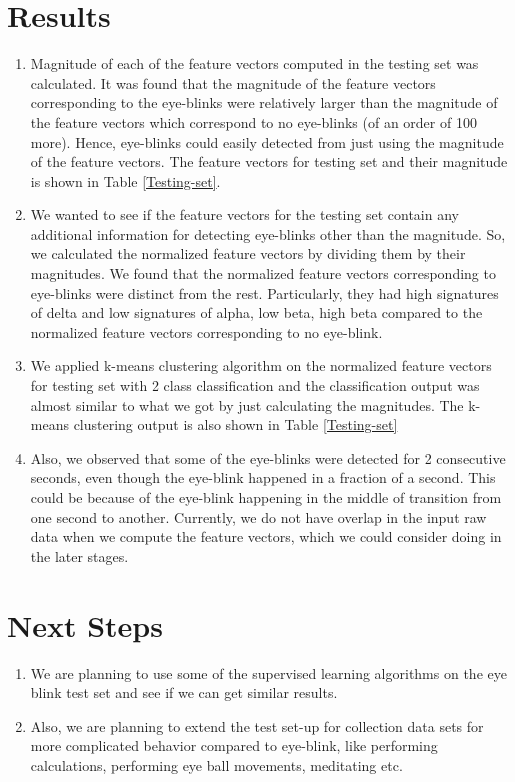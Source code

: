 \documentclass[11pt]{amsart}
\begin{document}
\section{Results}
\begin{enumerate}
\item Magnitude of each of the feature vectors computed in the testing set was calculated. It was found that the magnitude of the feature vectors corresponding to the eye-blinks were relatively larger than the magnitude of the feature vectors which correspond to no eye-blinks (of an order of 100 more). Hence, eye-blinks could easily detected from just using the magnitude of the feature vectors. The feature vectors for testing set and their magnitude is shown in Table \ref{Testing-set}.

\item We wanted to see if the feature vectors for the testing set contain any additional information for detecting eye-blinks other than the magnitude. So, we calculated the normalized feature vectors by dividing them by their magnitudes. We found that the normalized feature vectors corresponding to eye-blinks were distinct from the rest. Particularly, they had high signatures of delta and low signatures of alpha, low beta, high beta compared to the normalized feature vectors corresponding to no eye-blink.

\item We applied k-means clustering algorithm on the normalized feature vectors for testing set with 2 class classification and the classification output was almost similar to what we got by just calculating the magnitudes. The k-means clustering output is also shown in Table \ref{Testing-set}

\item Also, we observed that some of the eye-blinks were detected for 2 consecutive seconds, even though the eye-blink happened in a fraction of a second. This could be because of the eye-blink happening in the middle of transition from one second to another. Currently, we do not have overlap in the input raw data when we compute the feature vectors, which we could consider doing in the later stages.
\end{enumerate}

\section{Next Steps}
\begin{enumerate}
\item We are planning to use some of the supervised learning algorithms on the eye blink test set and see if we can get similar results.
\item Also, we are planning to extend the test set-up for collection data sets for more complicated behavior compared to eye-blink, like performing calculations, performing eye ball movements, meditating etc.
\end{enumerate}
\end{document}
